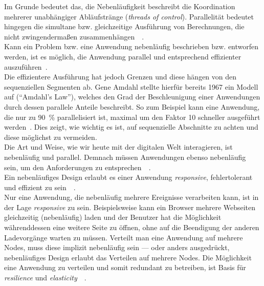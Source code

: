 Im Grunde bedeutet das, die Nebenläufigkeit beschreibt die Koordination mehrerer unabhängiger Abläufstränge (\textit{threads of control}). Parallelität bedeutet hingegen die simultane bzw. gleichzeitige Ausführung von Berechnungen, die nicht zwingendermaßen zusammenhängen~\cite[S.~8-9]{pike_concurrency_2012}~\cite[S.~3]{butcher_seven_2014}.\\
Kann ein Problem bzw. eine Anwendung nebenläufig beschrieben bzw. entworfen werden, ist es möglich, die Anwendung parallel und entsprechend effizienter auszuführen~\cite[S.~19~\&~S.~30]{pike_concurrency_2012}.\\
Die effizientere Ausführung hat jedoch Grenzen und diese hängen von den sequenziellen Segmenten ab. Gene Amdahl stellte hierfür bereits 1967 ein Modell auf (\enquote{Amdahl's Law}), welches den Grad der Beschleunigung einer Anwendungen durch dessen parallele Anteile beschreibt. So zum Beispiel kann eine Anwendung, die nur zu 90~\% parallelisiert ist, maximal um den Faktor 10 schneller ausgeführt werden~\cite{amdahl_validity_1967}. Dies zeigt, wie wichtig es ist, auf sequenzielle Abschnitte zu achten und diese möglichst zu vermeiden.\\

Die Art und Weise, wie wir heute mit der digitalen Welt interagieren, ist nebenläufig und parallel. Demnach müssen Anwendungen ebenso nebenläufig sein, um den Anforderungen zu entsprechen~\cite[S.~5]{butcher_seven_2014}~\cite[S.~3~\&~S.~178]{armstrong_programming_2013}.\\
Ein nebenläufiges Design erlaubt es einer Anwendung \textit{responsive}, fehlertolerant und effizient zu sein~\cite[S.~4~\&~S.~6]{butcher_seven_2014}~\cite[S.~6]{armstrong_programming_2013}.\\
Nur eine Anwendung, die nebenläufig mehrere Ereignisse verarbeiten kann, ist in der Lage \textit{responsive} zu sein. Beispielsweise kann ein Browser mehrere Webseiten gleichzeitig (nebenläufig) laden und der Benutzer hat die Möglichkeit währenddessen eine weitere Seite zu öffnen, ohne auf die Beendigung der anderen Ladevorgänge warten zu müssen. Verteilt man eine Anwendung auf mehrere Nodes, muss diese implizit nebenläufig sein --- oder anders ausgedrückt, nebenläufiges Design erlaubt das Verteilen auf mehrere Nodes. Die Möglichkeit eine Anwendung zu verteilen und somit redundant zu betreiben, ist Basis für \textit{resilience} und \textit{elasticity}~\cite[S.~6]{butcher_seven_2014}~\cite[S.~6~\&~S.~7]{armstrong_programming_2013}.\\

